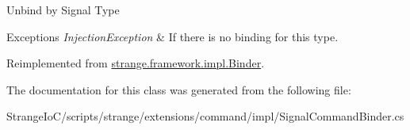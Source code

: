 Unbind by Signal Type


\begin{DoxyExceptions}{Exceptions}
{\em Injection\-Exception} & If there is no binding for this type.\\
\hline
\end{DoxyExceptions}


Reimplemented from \hyperlink{classstrange_1_1framework_1_1impl_1_1_binder_a3c385fdd591d1decb1334b7cdee0237a}{strange.\-framework.\-impl.\-Binder}.



The documentation for this class was generated from the following file\-:\begin{DoxyCompactItemize}
\item 
Strange\-Io\-C/scripts/strange/extensions/command/impl/Signal\-Command\-Binder.\-cs\end{DoxyCompactItemize}
